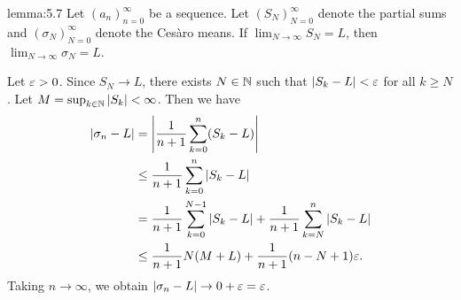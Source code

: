 \begin{lemma}{lemma:5.7}
    Let $(a_n)_{n=0}^\infty$ be a sequence. Let $(S_N)_{N=0}^\infty$ denote the 
    partial sums and $(\sigma_N)_{N=0}^\infty$ denote the Ces\`aro means. 
    If $\lim_{N\to\infty} S_N = L$, then $\lim_{N\to\infty} \sigma_N = L$. 
\end{lemma}
\begin{pf}
    Let $\varepsilon > 0$. Since $S_N \to L$, there exists $N \in \mathbb{N}$ such that 
    $|S_k - L| < \varepsilon$ for all $k \geq N$. Let $M = \sup_{k\in\mathbb{N}} |S_k| < \infty$. 
    Then we have 
    \begin{align*}
        |\sigma_n - L| &= \left| \frac{1}{n+1} \sum_{k=0}^n (S_k - L) \right| \\
        &\leq \frac{1}{n+1} \sum_{k=0}^n |S_k - L| \\ 
        &= \frac{1}{n+1} \sum_{k=0}^{N-1} |S_k - L| + \frac{1}{n+1} \sum_{k=N}^n |S_k - L| \\ 
        &\leq \frac{1}{n+1} N(M + L) + \frac{1}{n+1} (n - N + 1)\varepsilon . 
    \end{align*}
    Taking $n \to \infty$, we obtain $|\sigma_n - L| \to 0 + \varepsilon = \varepsilon$. 
\end{pf}